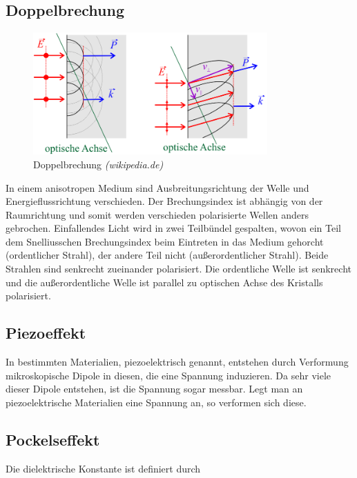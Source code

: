 \subsection{Doppelbrechung}

\begin{figure}[H]
	\centering \includegraphics[width = 0.8\textwidth]{Bilder/Doppelbrechung.jpg}
	\caption{Doppelbrechung \emph{(wikipedia.de)}}
\end{figure}

In einem anisotropen Medium sind Ausbreitungsrichtung der Welle und Energieflussrichtung verschieden. Der Brechungsindex ist abhängig von der Raumrichtung und somit werden verschieden polarisierte Wellen anders gebrochen. Einfallendes Licht wird in zwei Teilbündel gespalten, wovon ein Teil dem Snelliusschen Brechungsindex beim Eintreten in das Medium gehorcht (ordentlicher Strahl), der andere Teil nicht (außerordentlicher Strahl). Beide Strahlen sind senkrecht zueinander polarisiert. Die ordentliche Welle ist senkrecht und die außerordentliche Welle ist parallel zu optischen Achse des Kristalls polarisiert.


\subsection{Piezoeffekt}

In bestimmten Materialien, piezoelektrisch genannt, entstehen durch Verformung mikroskopische Dipole in diesen, die eine Spannung induzieren. Da sehr viele dieser Dipole entstehen, ist die Spannung sogar messbar. Legt man an piezoelektrische Materialien eine Spannung an, so verformen sich diese.


\subsection{Pockelseffekt}

Die dielektrische Konstante ist definiert durch 

